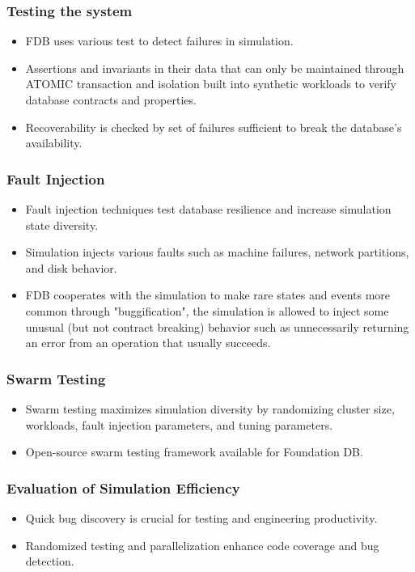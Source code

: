\begin{frame}
    \frametitle{Testing the system}
    \begin{itemize}
        \item FDB uses various test to detect failures in simulation.
        \item Assertions and invariants
in their data that can only be maintained through ATOMIC transaction and isolation built into synthetic workloads to verify database contracts and properties.
        \item Recoverability is checked by set of failures sufficient to break
the database’s availability.
    \end{itemize}
\end{frame}
\begin{frame}
    \frametitle{Fault Injection}
    \begin{itemize}
        \item Fault injection techniques test database resilience and increase simulation state diversity.
        \item Simulation injects various faults such as machine failures, network partitions, and disk behavior.
        \item FDB cooperates with the simulation to make rare states and events more common through "buggification", the simulation is allowed to inject some unusual (but not contract breaking) behavior such as unnecessarily returning an
error from an operation that usually succeeds.
    \end{itemize}
\end{frame}
\begin{frame}
    \frametitle{Swarm Testing}
    \begin{itemize}
        \item Swarm testing maximizes simulation diversity by randomizing cluster size, workloads, fault injection parameters, and tuning parameters.
        \item Open-source swarm testing framework available for Foundation DB.
    \end{itemize}
\end{frame}
\begin{frame}
    \frametitle{Evaluation of Simulation Efficiency}
    \begin{itemize}
        \item Quick bug discovery is crucial for testing and engineering productivity.
        \item Randomized testing and parallelization enhance code coverage and bug detection.
    \end{itemize}
\end{frame}
